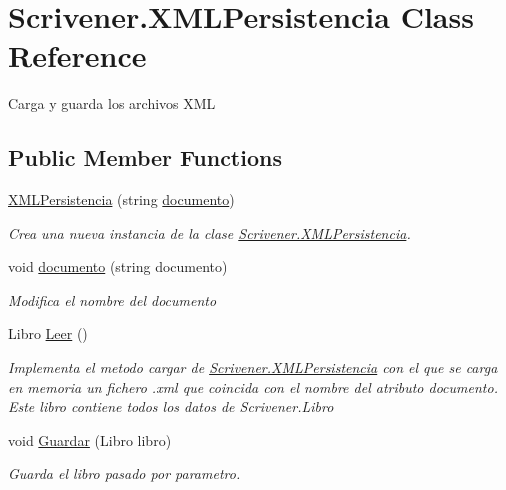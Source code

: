 \hypertarget{class_scrivener_1_1_x_m_l_persistencia}{\section{Scrivener.\-X\-M\-L\-Persistencia Class Reference}
\label{class_scrivener_1_1_x_m_l_persistencia}
}


Carga y guarda los archivos X\-M\-L  


\subsection*{Public Member Functions}
\begin{DoxyCompactItemize}
\item 
\hyperlink{class_scrivener_1_1_x_m_l_persistencia_a98f56fd63c6c4016d71ea40df528e1fd}{X\-M\-L\-Persistencia} (string \hyperlink{class_scrivener_1_1_x_m_l_persistencia_a9921811ddd3e998ad9d6cc42e107e5a0}{documento})
\begin{DoxyCompactList}\small\item\em Crea una nueva instancia de la clase \hyperlink{class_scrivener_1_1_x_m_l_persistencia}{Scrivener.\-X\-M\-L\-Persistencia}. \end{DoxyCompactList}\item 
void \hyperlink{class_scrivener_1_1_x_m_l_persistencia_a9921811ddd3e998ad9d6cc42e107e5a0}{documento} (string documento)
\begin{DoxyCompactList}\small\item\em Modifica el nombre del documento \end{DoxyCompactList}\item 
Libro \hyperlink{class_scrivener_1_1_x_m_l_persistencia_a2c3af56aadc9cf02d68a2632aa94826b}{Leer} ()
\begin{DoxyCompactList}\small\item\em Implementa el metodo cargar de \hyperlink{class_scrivener_1_1_x_m_l_persistencia}{Scrivener.\-X\-M\-L\-Persistencia} con el que se carga en memoria un fichero .xml que coincida con el nombre del atributo documento. Este libro contiene todos los datos de Scrivener.\-Libro \end{DoxyCompactList}\item 
void \hyperlink{class_scrivener_1_1_x_m_l_persistencia_a44df1dfea4a03bab167a4c2c55d09d23}{Guardar} (Libro libro)
\begin{DoxyCompactList}\small\item\em Guarda el libro pasado por parametro. \end{DoxyCompactList}\end{DoxyCompactItemize}


